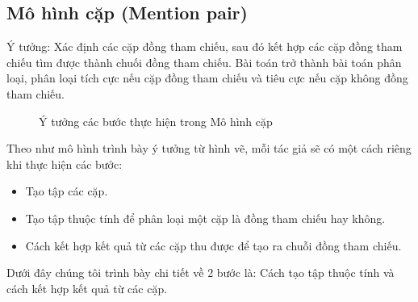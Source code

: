 \documentclass[12pt]{report}
\begin{document}
			\subsection*{Mô hình cặp (Mention pair)}
				\par Ý tưởng:  Xác định các cặp đồng tham chiếu, sau đó kết hợp các cặp đồng tham chiếu tìm được thành chuối đồng tham chiếu. Bài toán trở thành bài toán phân loại, phân loại tích cực nếu cặp đồng tham chiếu và tiêu cực nếu cặp không đồng tham chiếu.
				\begin{figure}[H]
					\centering
					
					\caption{Ý tưởng các bước thực hiện trong Mô hình cặp}
				\end{figure}
				\par Theo như mô hình trình bày ý tưởng từ hình vẽ, mỗi tác giả sẽ có một cách riêng khi thực hiện các bước:
				\begin{itemize}
					\item{Tạo tập các cặp.}
					\item{Tạo tập thuộc  tính để phân loại một cặp là đồng tham chiếu hay không.}
					\item{Cách kết hợp kết quả từ các cặp thu được để tạo ra chuỗi đồng tham chiếu.}
				\end{itemize}
				\par Dưới đây chúng tôi trình bày chi tiết về 2 bước là: Cách tạo tập thuộc tính và cách kết hợp kết quả từ các cặp.
\end{document}
